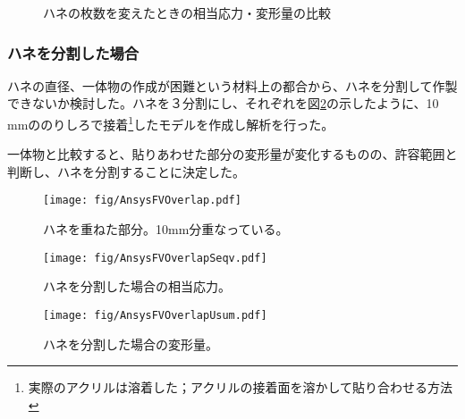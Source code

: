 \documentclass[11pt]{jreport}
\newcommand{\figref}[1]{図\ref{#1}}
\begin{document}
\begin{figure}[htbp]
  \begin{minipage}{0.47\textwidth}
  \end{minipage}
  \hfill
  \begin{minipage}{0.47\textwidth}
  \end{minipage}
    \caption{ハネの枚数を変えたときの相当応力・変形量の比較}
  \label{AnsysFVCirc2}
\end{figure}



\subsubsection{ハネを分割した場合}
ハネの直径、一体物の作成が困難という材料上の都合から、ハネを分割して作製できないか検討した。ハネを３分割にし、それぞれを\figref{AnsysFVOverlap}の示したように、10 mmののりしろで接着\footnote{実際のアクリルは溶着した；アクリルの接着面を溶かして貼り合わせる方法}したモデルを作成し解析を行った。

一体物と比較すると、貼りあわせた部分の変形量が変化するものの、許容範囲と判断し、ハネを分割することに決定した。

\begin{figure}[htbp]
\centering
\texttt{[image: fig/AnsysFVOverlap.pdf]}
\caption[ハネを重ねた部分]{ハネを重ねた部分。10mm分重なっている。}
\label{AnsysFVOverlap}
\end{figure}

\begin{figure}[htbp]
\begin{minipage}{0.47\textwidth}
\centering
\texttt{[image: fig/AnsysFVOverlapSeqv.pdf]}
\caption[ハネを分割した場合の相当応力]{ハネを分割した場合の相当応力。}
\label{AnsysFVOverlapSeqv}
\end{minipage}
\hfill
\begin{minipage}{0.47\textwidth}
\centering
\texttt{[image: fig/AnsysFVOverlapUsum.pdf]}
\caption[ハネを分割した場合の変形量]{ハネを分割した場合の変形量。}
\label{AnsysFVOverlapUsum}
\end{minipage}
\end{figure}
\fi%
\end{document}
